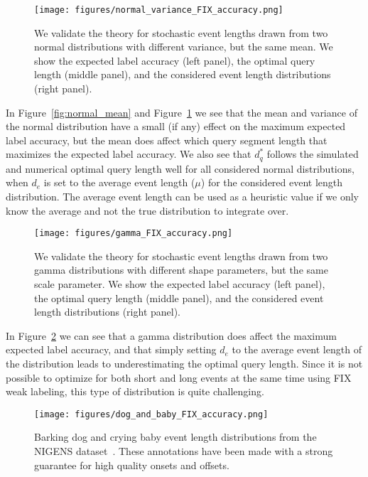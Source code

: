 \begin{figure}
    \centering
    \texttt{[image: figures/normal\_variance\_FIX\_accuracy.png]}
    \caption{We validate the theory for stochastic event lengths drawn from two normal distributions with different variance, but the same mean. We show the expected label accuracy (left panel), the optimal query length (middle panel), and the considered event length distributions (right panel).}
    \label{fig:normal_variance}
\end{figure}


In Figure~\ref{fig:normal_mean} and Figure~\ref{fig:normal_variance} we see that the mean and variance of the normal distribution have a small (if any) effect on the maximum expected label accuracy, but the mean does affect which query segment length that maximizes the expected label accuracy. We also see that $d_q^*$ follows the simulated and numerical optimal query length well for all considered normal distributions, when $d_e$ is set to the average event length ($\mu$) for the considered event length distribution. The average event length can be used as a heuristic value if we only know the average and not the true distribution to integrate over.

\begin{figure}
    \centering
    \texttt{[image: figures/gamma\_FIX\_accuracy.png]}
    \caption{We validate the theory for stochastic event lengths drawn from two gamma distributions with different shape parameters, but the same scale parameter. We show the expected label accuracy (left panel), the optimal query length (middle panel), and the considered event length distributions (right panel).}
    \label{fig:gamma}
\end{figure}

In Figure~\ref{fig:gamma} we can see that a gamma distribution does affect the maximum expected label accuracy, and that simply setting $d_e$ to the average event length of the distribution leads to underestimating the optimal query length. Since it is not possible to optimize for both short and long events at the same time using FIX weak labeling, this type of distribution is quite challenging.

\begin{figure}
    \centering
    \texttt{[image: figures/dog\_and\_baby\_FIX\_accuracy.png]}
    \caption{Barking dog and crying baby event length distributions from the NIGENS dataset~\citep{Trowitzsch2019}. These annotations have been made with a strong guarantee for high quality onsets and offsets.}
    \label{fig:dog_and_baby}
\end{figure}

